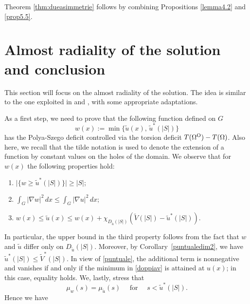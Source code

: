\documentclass[oneside,a4paper,11pt,notitlepage]{article}
\newcommand{\abs}[1]{{\left|#1\right|}}
\theoremstyle{definition}
\theoremstyle{plain}
\theoremstyle{definition}
\newcommand{\OO}{\text{\normalfont  O}}
\begin{document}
Theorem \ref{thm:dueasimmetrie} follows by combining Propositions \ref{lemma4.2} and \ref{prop5.5}.
\section{Almost radiality of the solution and conclusion}\label{section6}

This section will focus on the almost radiality of the solution.
The idea is similar to the one exploited in \cite{ABCMP} and \cite{ABMP}, with some appropriate adaptations.

As a first step, we need to prove that the  following function defined on $G$ 
\begin{equation}
\label{doppiav}
    w(x):= \min\{ \tilde u(x), \, \tilde u^\ast(\abs{S})\}
\end{equation}
has the Polya-Szego deficit controlled via the torsion deficit $T(\Omega^\OO) -T(\Omega)$. Also here, we recall that the tilde notation is used to denote the extension of a function by constant values on the holes of the domain. We observe that for $w(x)$ the following properties hold:
\begin{enumerate}
    \item $\Big\lvert \{w\geq \tilde u^\ast(\abs{S})\}\Big\rvert\geq \abs{S}$;
    \item $\displaystyle{\int_G \abs{\nabla w}^2 \, dx \leq  \int_G \abs{\nabla u}^2 \, dx }$;
    \item $\displaystyle{w(x)\leq \tilde u(x) \leq w(x) + \chi_{D_{\tilde u}(\abs{S})}\left(\tilde V(\abs{S})-\tilde u^\ast(\abs{S})\right)}$.
\end{enumerate}
In particular, the upper bound in the third property follows from the fact that $w$ and $\tilde u$ differ only on $D_{\tilde u}(|S|)$. Moreover, by Corollary~\ref{puntualedim2}, we have $\tilde u^\ast(|S|) \leq \tilde V^\ast(|S|)$. In view of \eqref{puntuale}, the additional term is nonnegative and vanishes if and only if the minimum in \eqref{doppiav} is attained at \(u(x)\); in this case, equality holds. We, lastly, stress that 
\begin{equation}
\label{distrw}
     \mu_{w}(s) = \mu_{\tilde u}(s) \quad\text{ for } \quad s < \tilde u^\ast (\abs{S}).
\end{equation}
Hence we have
\end{document}
